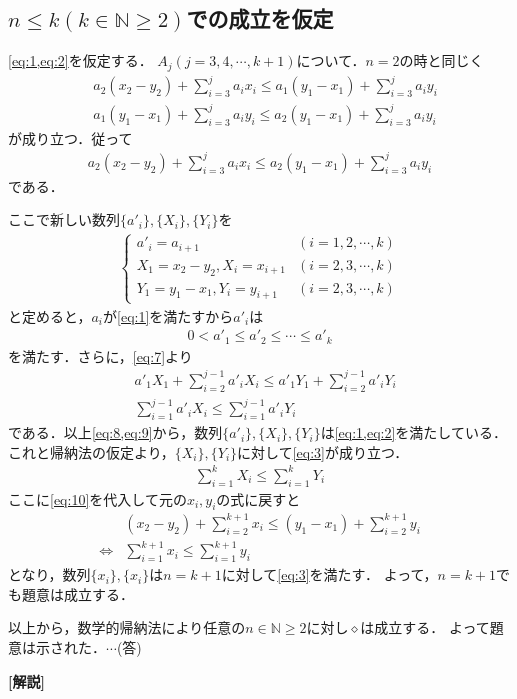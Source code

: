 \documentclass[a4paper,10pt]{ltjsarticle}
\begin{document}
\begin{multicols}{2}
  \subsection{$n\le k (k \in \mathbb{N} \ge 2)$での成立を仮定}

  \cref{eq:1,eq:2}を仮定する．
  $A_j (j=3,4,\cdots,k+1)$について．$n=2$の時と同じく
  \begin{align*}
     & a_2 (x_2 - y_2) + \sum_{i=3}^{j} a_i x_i \le a_1 (y_1 - x_1) + \sum_{i=3}^{j} a_i y_i \\
     & a_1 (y_1 - x_1) + \sum_{i=3}^{j} a_i y_i \le a_2 (y_1 - x_1) + \sum_{i=3}^{j} a_i y_i
  \end{align*}
  が成り立つ．従って
  \begin{align}
    a_2 (x_2 - y_2) + \sum_{i=3}^{j} a_i x_i \le a_2 (y_1 - x_1) + \sum_{i=3}^{j} a_i y_i \label{eq:7}
  \end{align}
  である．

  ここで新しい数列$\{a'_i\}, \{X_i\}, \{Y_i\}$を
  \begin{align}
    \begin{cases}
      a'_i = a_{i+1}                 & (i=1,2,\cdots,k) \\
      X_1 = x_2 - y_2, X_i = x_{i+1} & (i=2,3,\cdots,k) \\
      Y_1 = y_1 - x_1, Y_i = y_{i+1} & (i=2,3,\cdots,k)
    \end{cases} \label{eq:10}
  \end{align}
  と定めると，$a_i$が\cref{eq:1}を満たすから$a'_{i}$は
  \begin{align}
    0 < a'_1 \le a'_2 \le \cdots \le a'_{k} \label{eq:8}
  \end{align}
  を満たす．さらに，\cref{eq:7}より
  \begin{align}
     & a'_1 X_1 + \sum_{i=2}^{j-1} a'_i X_i \le  a'_1 Y_1 + \sum_{i=2}^{j-1} a'_i Y_i \nonumber \\
     & \sum_{i=1}^{j-1} a'_{i}X_{i} \le \sum_{i=1}^{j-1} a'_{i}Y_{i} \label{eq:9}
  \end{align}
  である．以上\cref{eq:8,eq:9}から，数列$\{a'_i\}, \{X_i\}, \{Y_i\}$は\cref{eq:1,eq:2}を満たしている．
  これと帰納法の仮定より，$\{X_i\}, \{Y_i\}$に対して\cref{eq:3}が成り立つ．
  \begin{align*}
    \sum_{i=1}^{k} X_i \le \sum_{i=1}^{k} Y_i
  \end{align*}
  ここに\cref{eq:10}を代入して元の$x_i,y_i$の式に戻すと
  \begin{align*}
         & \left(x_2 - y_2\right) + \sum_{i=2}^{k+1} x_i
    \le \left(y_1 - x_1\right) + \sum_{i=2}^{k+1} y_i    \\
    \iff &
    \sum_{i=1}^{k+1} x_i \le \sum_{i=1}^{k+1} y_i
  \end{align*}
  となり，数列$\{x_i\}, \{x_i\}$は$n=k+1$に対して\cref{eq:3}を満たす．
  よって，$n=k+1$でも題意は成立する．

  \vspace{10pt}
  以上から，数学的帰納法により任意の$n \in \mathbb{N} \ge 2$に対し$\diamond$は成立する．
  よって題意は示された．$\cdots$(答)

  \vspace{10pt}
  {\bf[解説]}





  \newpage
\end{multicols}
\end{document}
